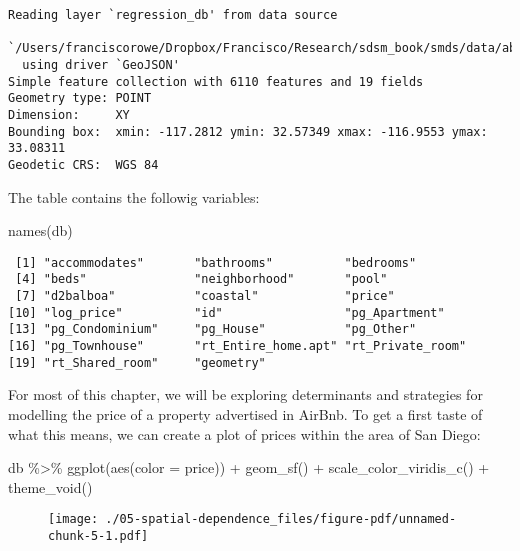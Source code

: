 \documentclass[
  letterpaper,
  krantz2]{style/krantz}
\newenvironment{Shaded}{\begin{snugshade}}{\end{snugshade}}
\newcommand{\AttributeTok}[1]{\textcolor[rgb]{0.40,0.45,0.13}{#1}}
\newcommand{\FunctionTok}[1]{\textcolor[rgb]{0.28,0.35,0.67}{#1}}
\newcommand{\NormalTok}[1]{\textcolor[rgb]{0.00,0.23,0.31}{#1}}
\newcommand{\SpecialCharTok}[1]{\textcolor[rgb]{0.37,0.37,0.37}{#1}}
\begin{document}
\begin{verbatim}
Reading layer `regression_db' from data source 
  `/Users/franciscorowe/Dropbox/Francisco/Research/sdsm_book/smds/data/abb_sd/regression_db.geojson' 
  using driver `GeoJSON'
Simple feature collection with 6110 features and 19 fields
Geometry type: POINT
Dimension:     XY
Bounding box:  xmin: -117.2812 ymin: 32.57349 xmax: -116.9553 ymax: 33.08311
Geodetic CRS:  WGS 84
\end{verbatim}

The table contains the followig variables:

\begin{Shaded}
\begin{Highlighting}[]
\FunctionTok{names}\NormalTok{(db)}
\end{Highlighting}
\end{Shaded}

\begin{verbatim}
 [1] "accommodates"       "bathrooms"          "bedrooms"          
 [4] "beds"               "neighborhood"       "pool"              
 [7] "d2balboa"           "coastal"            "price"             
[10] "log_price"          "id"                 "pg_Apartment"      
[13] "pg_Condominium"     "pg_House"           "pg_Other"          
[16] "pg_Townhouse"       "rt_Entire_home.apt" "rt_Private_room"   
[19] "rt_Shared_room"     "geometry"          
\end{verbatim}

For most of this chapter, we will be exploring determinants and
strategies for modelling the price of a property advertised in AirBnb.
To get a first taste of what this means, we can create a plot of prices
within the area of San Diego:

\begin{Shaded}
\begin{Highlighting}[]
\NormalTok{db }\SpecialCharTok{\%\textgreater{}\%}
  \FunctionTok{ggplot}\NormalTok{(}\FunctionTok{aes}\NormalTok{(}\AttributeTok{color =}\NormalTok{ price)) }\SpecialCharTok{+}
  \FunctionTok{geom\_sf}\NormalTok{() }\SpecialCharTok{+} 
  \FunctionTok{scale\_color\_viridis\_c}\NormalTok{() }\SpecialCharTok{+}
  \FunctionTok{theme\_void}\NormalTok{()}
\end{Highlighting}
\end{Shaded}

\begin{figure}[H]

{\centering \texttt{[image: ./05-spatial-dependence\_files/figure-pdf/unnamed-chunk-5-1.pdf]}

}

\end{figure}
\end{document}
